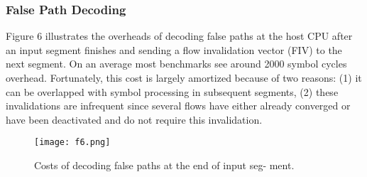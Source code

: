 \subsubsection{False Path Decoding} 
Figure 6 illustrates the overheads of decoding false paths at the host CPU after an input segment finishes
and sending a flow invalidation vector (FIV) to the next segment.
On an average most benchmarks see around 2000 symbol cycles
overhead. Fortunately, this cost is largely amortized because of two
reasons: (1) it can be overlapped with symbol processing in subsequent segments, (2) these invalidations are infrequent since several
flows have either already converged or have been deactivated and do
not require this invalidation.
\begin{figure}[!]
    \texttt{[image: f6.png]}
    \centering
    \caption{Costs of decoding false paths at the end of input seg-
    ment.}
\end{figure}